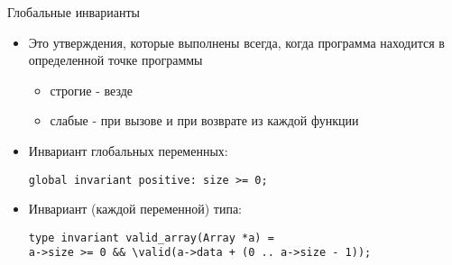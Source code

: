 \documentclass[hyperref={unicode=true}]{beamer}
\begin{document}

%

    \begin{frame}[fragile]{Глобальные инварианты}
    \begin{itemize}
    \item
    Это утверждения, которые выполнены всегда, когда
    программа находится в определенной точке программы
        \begin{itemize}
        \item строгие - везде
        \item слабые - при вызове и при возврате из
        каждой функции
        \end{itemize}
    \item Инвариант глобальных переменных:
    \begin{block}{}
    \verb|global invariant positive: size >= 0;|
    \end{block}
    \item Инвариант (каждой переменной) типа:
    \begin{block}{}
    \begin{verbatim}type invariant valid_array(Array *a) =
a->size >= 0 && \valid(a->data + (0 .. a->size - 1));\end{verbatim}
    \end{block}
    \end{itemize}
    \end{frame}
\end{document}
